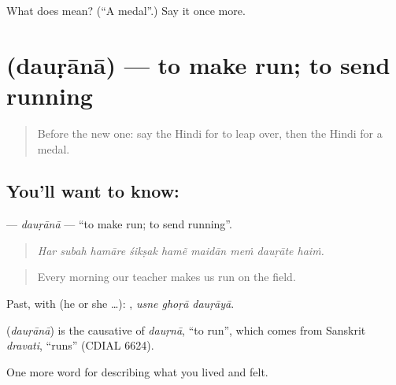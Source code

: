 \begin{tcolorbox}[breakable,colback=teal!4,colframe=teal!35!black,title={Before you move on}]
What does  mean? (\textquotedblleft{}A medal\textquotedblright{}.) Say it once more.
\end{tcolorbox}
\section[\texorpdfstring{\hi{दौड़ाना} (dauṛānā)}{दौड़ाना (dauṛānā)}]{ (dauṛānā) — to make run; to send running}

\label{lesson:HI-C535-daurana}



\begin{quote}
Before the new one: say the Hindi for to leap over, then the Hindi for a medal.
\end{quote}

\subsection*{You'll want to know: }
\textbf{} — \emph{dauṛānā} — \textquotedblleft{}to make run; to send running\textquotedblright{}.

\begin{quote}
        
\end{quote}

\begin{quote}
\emph{Har subah hamāre śikṣak hamẽ maidān meṁ dauṛāte haiṁ.}
\end{quote}

\begin{quote}
Every morning our teacher makes us run on the field.
\end{quote}

Past, with  (he or she …):   , \emph{usne ghoṛā dauṛāyā}.

\begin{cousinweb}
\textbf{} (\emph{dauṛānā}) is the causative of \emph{dauṛnā}, \textquotedblleft{}to run\textquotedblright{}, which comes from Sanskrit \emph{dravati}, \textquotedblleft{}runs\textquotedblright{} (CDIAL 6624).
\end{cousinweb}

\begin{grammarlens}[title={What you've built}]
One more word for describing what you lived and felt.
\end{grammarlens}

